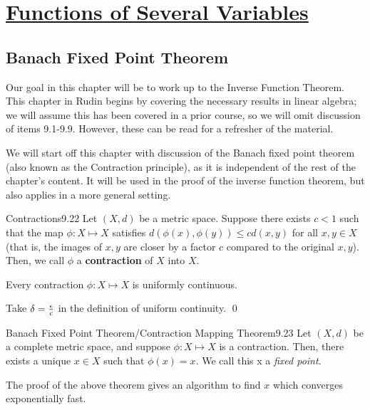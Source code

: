 \newpage
\section[Functions of Several Variables]{\hyperlink{toc}{Functions of Several Variables}}

\subsection{Banach Fixed Point Theorem}
\noindent Our goal in this chapter will be to work up to the Inverse Function Theorem. This chapter in Rudin begins by covering the necessary results in linear algebra; we will assume this has been covered in a prior course, so we will omit discussion of items 9.1-9.9. However, these can be read for a refresher of the material.

We will start off this chapter with discussion of the Banach fixed point theorem (also known as the Contraction principle), as it is independent of the rest of the chapter's content. It will be used in the proof of the inverse function theorem, but also applies in a more general setting.

\setcounter{rudin}{21}

\begin{definition}{Contractions}{9.22}
    Let $(X, d)$ be a metric space. Suppose there exists $c < 1$ such that the map $\phi: X \mapsto X$ satisfies $d(\phi(x), \phi(y)) \leq cd(x, y)$ for all $x, y \in X$ (that is, the images of $x, y$ are closer by a factor $c$ compared to the original $x, y$). Then, we call $\phi$ a \textbf{contraction} of $X$ into $X$.
\end{definition}
\begin{nlemma}{}{}
    Every contraction $\phi: X \mapsto X$ is uniformly continuous.
\end{nlemma}
\begin{nproof}
    Take $\delta = \frac{\epsilon}{c}$ in the definition of uniform continuity. \qed
\end{nproof}

\begin{theorem}{Banach Fixed Point Theorem/Contraction Mapping Theorem}{9.23}
    Let $(X, d)$ be a complete metric space, and suppose $\phi: X \mapsto X$ is a contraction. Then, there exists a unique $x \in X$ such that $\phi(x) = x$. We call this x a \emph{fixed point}. 
\end{theorem}
\noindent The proof of the above theorem gives an algorithm to find $x$ which converges exponentially fast.

